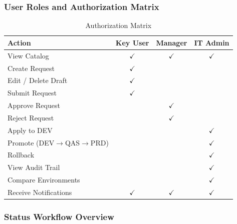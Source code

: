 \documentclass[12pt,a4paper]{report}
\begin{document}
\subsubsection{User Roles and Authorization Matrix}

\begin{table}[H]
\centering\small
\begin{tabular}{|l|c|c|c|}
  \hline
  \rowcolor{tableheadpeach}
  \textbf{Action} & \textbf{Key User} & \textbf{Manager} & \textbf{IT Admin} \\ \hline
  View Catalog                              & $\checkmark$ & $\checkmark$ & $\checkmark$ \\ \hline
  Create Request                            & $\checkmark$ &              &              \\ \hline
  Edit / Delete Draft                       & $\checkmark$ &              &              \\ \hline
  Submit Request                            & $\checkmark$ &              &              \\ \hline
  Approve Request                           &              & $\checkmark$ &              \\ \hline
  Reject Request                            &              & $\checkmark$ &              \\ \hline
  Apply to DEV                              &              &              & $\checkmark$ \\ \hline
  Promote (DEV$\rightarrow$QAS$\rightarrow$PRD) &          &              & $\checkmark$ \\ \hline
  Rollback                                  &              &              & $\checkmark$ \\ \hline
  View Audit Trail                          &              &              & $\checkmark$ \\ \hline
  Compare Environments                      &              &              & $\checkmark$ \\ \hline
  Receive Notifications                     & $\checkmark$ & $\checkmark$ & $\checkmark$ \\ \hline
\end{tabular}
\caption{Authorization Matrix}
\label{tab:auth-matrix}
\end{table}

\subsubsection{Status Workflow Overview}
\end{document}
